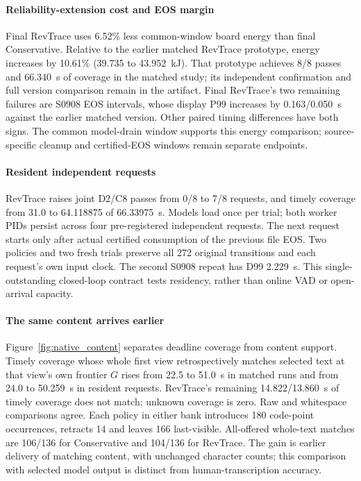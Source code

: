 \paragraph{Reliability-extension cost and EOS margin}
Final RevTrace uses 6.52\% less common-window board energy than final
Conservative. Relative to the earlier matched RevTrace prototype, energy
increases by 10.61\% (39.735 to 43.952~kJ). That prototype achieves 8/8
passes and 66.340~s of coverage in the matched study; its independent
confirmation and full version comparison remain in the artifact.
Final RevTrace's two remaining failures are S0908 EOS intervals, whose
display P99 increases by 0.163/0.050~s against the earlier matched version.
Other paired timing differences have both signs. The common model-drain
window supports this energy comparison; source-specific cleanup and
certified-EOS windows remain separate endpoints.

\paragraph{Resident independent requests}
RevTrace raises joint D2/C8 passes from 0/8 to 7/8 requests, and timely
coverage from 31.0 to 64.118875 of 66.33975~s. Models load once per trial;
both worker PIDs persist across four pre-registered independent requests.
The next request starts only after actual certified consumption of the
previous file EOS. Two policies and two fresh trials preserve all 272
original transitions and each request's own input clock. The second
S0908 repeat has D99 2.229~s. This single-outstanding closed-loop contract
tests residency, rather than online VAD or open-arrival capacity.

\paragraph{The same content arrives earlier}
Figure~\ref{fig:native_content} separates deadline coverage from content
support. Timely coverage whose whole first view retrospectively matches selected
text at that view's own frontier $G$ rises from 22.5 to 51.0~s in matched
runs and from 24.0 to 50.259~s in resident requests. RevTrace's remaining
14.822/13.860~s of timely coverage does not match; unknown coverage is zero.
Raw and whitespace comparisons agree. Each policy in either bank
introduces 180 code-point occurrences, retracts 14 and leaves 166
last-visible. All-offered whole-text matches are 106/136 for Conservative
and 104/136 for RevTrace. The gain is earlier delivery of matching content,
with unchanged character counts; this comparison with selected model
output is distinct from human-transcription accuracy.

